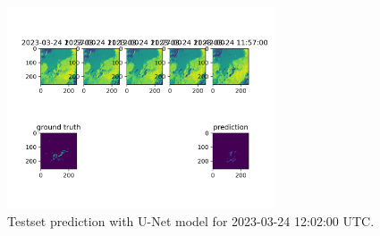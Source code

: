 \begin{figure}[hbp]
  \centering
  \includegraphics[width=225pt]{./images/experiment-0-unet.png}
  \caption{Testset prediction with U-Net model for 2023-03-24 12:02:00 UTC.}
  \Description{}
  \label{fig:unet}
\end{figure}